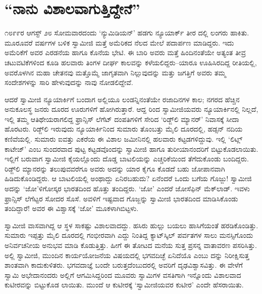 
\chapter{“ನಾನು ವಿಶಾಲವಾಗುತ್ತಿದ್ದೇನೆ”}

\noindent

೧೮೯೯ರ ಆಗಸ್ಟ್ ೨೮ ಸೋಮವಾರದಂದು ‘ನ್ಯುಮಿಡಿಯನ್​’ ಹಡಗು ನ್ಯೂಯಾರ್ಕ್ ತೀರ ದಲ್ಲಿ ಲಂಗರು ಹಾಕಿತು. ಮೂರೂವರೆ ವರ್ಷಗಳ ಬಳಿಕ ಸ್ವಾಮೀಜಿ ಮತ್ತೆ ಅಮೆರಿಕದ ನೆಲದ ಮೇಲೆ ಪದಾರ್ಪಣ ಮಾಡಿದ್ದರು. ಇದು ಅಮೆರಿಕೆಗೆ ಅವರ ಎರಡನೆಯ ಹಾಗೂ ಕೊನೆಯ ಭೇಟಿ. ಈ ಬಾರಿ ಅವರು ಮತ್ತೆ ಹಿಂದಿನಂತೆಯೇ ಅತ್ಯಂತ ತೀವ್ರ ಚಟುವಟಿಕೆಗಳಿಂದ ಕೂಡಿ ಹಲವಾರು ತಿಂಗಳ ದೀರ್ಘ ಕಾಲವನ್ನು ಕಳೆಯಲಿದ್ದರು–ಯಾರೂ ಊಹಿಸಿರದಿದ್ದ ರೀತಿಯಲ್ಲಿ, ಅವರೊಳಗಿನ ಮಹಾ ಚೇತನವು ಮತ್ತೊಮ್ಮೆ ಜಾಗೃತವಾಗಿ ನಿಲ್ಲುವುದನ್ನು ಮತ್ತು ಜಗತ್ತಿಗೆ ಅವರು ತಮ್ಮ ಸಂದೇಶಗಳನ್ನು ಸಾರಿ ಹೇಳುವುದನ್ನು ನಾವು ನೋಡಲಿದ್ದೇವೆ.

ಆದರೆ ಸ್ವಾಮೀಜಿ ನ್ಯೂಯಾರ್ಕಿಗೆ ಬಂದಾಗ ಅಲ್ಲಿಯೂ ಲಂಡನ್ನಿನಂತೆಯೇ ರಜಾದಿನಗಳ ಕಾಲ; ನಗರದ ಹೆಚ್ಚಿನ ಅನುಕೂಲಸ್ಥ ಜನರು ದೂರದ ಊರುಗಳಿಗೆ ಹೋಗಿರುತ್ತಾರೆ. ಆದ್ದ ರಿಂದ ಸ್ವಾಮೀಜಿಯವರು ನ್ಯೂಯಾರ್ಕಿನಲ್ಲಿ ನಿಲ್ಲದೆ, ಇಲ್ಲಿ ತಮ್ಮ ಆತಿಥೇಯರಾಗಲಿದ್ದ ಫ್ರಾನ್ಸಿಸ್ ಲೆಗೆಟ್ ದಂಪತಿಗಳಿಗೆ ಸೇರಿದ ‘ರಿಡ್ಜ್​ಲಿ ಮ್ಯಾನರ್​’ ನಿವಾಸಕ್ಕೆ ಸೀದಾ ಹೊರಟರು. ರಿಡ್ಜ್​ಲಿ ಇರುವುದು ನ್ಯೂಯಾರ್ಕಿನಿಂದ ಸುಮಾರು ತೊಂಬತ್ತು ಮೈಲಿ ದೂರದಲ್ಲಿ, ಹಡ್ಸನ್ ನದಿಯ ಕಣಿವೆಯಲ್ಲಿ. ಸುಮಾರು ಐವತ್ತು ಎಕರೆಯ ಈ ವಿಶಾಲ ಜಮೀನಿನಲ್ಲಿ ಹಲವಾರು ಕಟ್ಟಡಗಳಿದ್ದುವು. ಇಲ್ಲಿ ‘ಲಿಟ್ಲ್ ಕಾಟೇಜ್​’ ಎಂಬ ಸುಂದರವಾದ ಪುಟ್ಟ ಕಟ್ಟಡವೊಂದನ್ನು ಸ್ವಾಮೀಜಿ ಹಾಗೂ ತುರೀಯಾನಂದರಿಗೆ ಬಿಟ್ಟುಕೊಡಲಾಯಿತು. ಇಲ್ಲಿಗೆ ಬರುವಾಗ ಸ್ವಾಮೀಜಿ ಕೈಯಲ್ಲೊಂದು ದೊಡ್ಡ ಬಾಟಲಿಯನ್ನು ಎಚ್ಚರಿಕೆಯಿಂದ ತೆಗೆದುಕೊಂಡು ಬಂದಿದ್ದರು. ರಿಡ್ಜ್​ಲಿ ಮ್ಯಾನರನ್ನು ತಲುಪುವವರೆಗೂ ಅವರು ಅದನ್ನು ಯಾರ ಕೈಗೂ ಕೊಡದೆ ಬಹು ಜೋಪಾನವಾಗಿ ಹಿಡಿದುಕೊಂಡಿದ್ದರು. ಆ ಬಾಟಲಿಯಲ್ಲಿ ಅಂಥಾದ್ದು ಏನಿರಬಹುದು? ಏನೆಂದರೆ ಒಂದು ಬಗೆಯ ಗೊಜ್ಜು! ಸ್ವಾಮೀಜಿ ಅದನ್ನು ‘ಜೋ’ಳಿಗೋಸ್ಕರ ಭಾರತದಿಂದ ಹೊತ್ತು ತಂದಿದ್ದರು. ‘ಜೋ’ ಎಂದರೆ ಜೋಸೆಫಿನ್ ಮೆಕ್​ಲಾಡ್. ಇವಳು ಫ್ರಾನ್ಸಿಸ್ ಲೆಗೆಟ್ಟರ ಸೋದರ ಸೊಸೆ. ಅವಳಿಗೆ ಇಷ್ಟವಾದ ಗೊಜ್ಜನ್ನು ಸ್ವಾಮೀಜಿ ಭಾರತದಿಂದ ಮಾಡಿಸಿಕೊಂಡು ತಂದಿದ್ದಾರೆ! ಅವರ ಈ ವಿಶ್ವಾಸಕ್ಕೆ ‘ಜೋ’ ಮೂಕಳಾಗಿಬಿಟ್ಟಳು.

ಸ್ವಾಮೀಜಿ ವಾಸವಾಗಿದ್ದ ಆ ಸ್ಥಳ ಸಾಕಷ್ಟು ವಿಶಾಲವಾದದ್ದು. ಹಸಿರು ಹುಲ್ಲು ಬಯಲು ಹಾಸಿಗೆಯಂತೆ ಹರಡಿಕೊಂಡಿತ್ತು. ಸುಮಾರು ಇಪ್ಪತ್ತು ಮೈಲಿ ದೂರದಲ್ಲಿ ಗಂಭೀರವಾಗಿ ಎದ್ದು ನಿಂತಿದ್ದ ಕ್ಯಾಟ್​ಸ್ಕಿಲ್ ಪರ್ವತಗಳ ಸಾಲು ಮನಸ್ಸಿಗೊಂದು ಅನಿರ್ವಚನೀಯ ಅನುಭವ ಮಾಡಿ ಕೊಡುತ್ತಿತ್ತು. ಹೀಗೆ ಈ ತೋಟದ ಮನೆಯ ಸುತ್ತ ಪ್ರಸನ್ನ ವಾತಾವರಣ ಪಸರಿಸಿತ್ತು. ಅಲ್ಲಿ ಸ್ವಾಮೀಜಿ, ಮುಂದಿನ ಕಾರ್ಯಯೋಜನೆಯ ವಿಷಯದಲ್ಲಿ ಭಗವದಿಚ್ಛೆ ಏನಿದೆಯೊ ಎಂಬು ದನ್ನು ನಿರೀಕ್ಷಿಸುತ್ತ ಶಾಂತವಾಗಿ ಕಾದುಕುಳಿತರು. ಭಗವದಾಜ್ಞೆ ಬಂದೇ ಬರುತ್ತದೆಂಬುದರಲ್ಲಿ ಅವರಿಗೆ ದೃಢವಿಶ್ವಾಸವಿತ್ತು. ಈ ವೇಳೆಗೆ ಸ್ವಾಮಿ ಅಭೇದಾನಂದರು ಅಲ್ಲಿಗೆ ಆಗಮಿಸಿದ್ದರಿಂದ ಮೂವರು ಸ್ವಾಮಿಗಳ ವಸತಿಗಾಗಿ ಇನ್ನೊಂದು ವಿಶಾಲವಾದ ಕುಟೀರವನ್ನು ಬಿಟ್ಟುಕೊಡ ಲಾಯಿತು. ಮುಂದೆ ಆ ಕುಟೀರಕ್ಕೆ ‘ಸ್ವಾಮೀಜಿಯವರ ಕುಟೀರ’ ಎಂದೇ ಹೆಸರಾಯಿತು.


